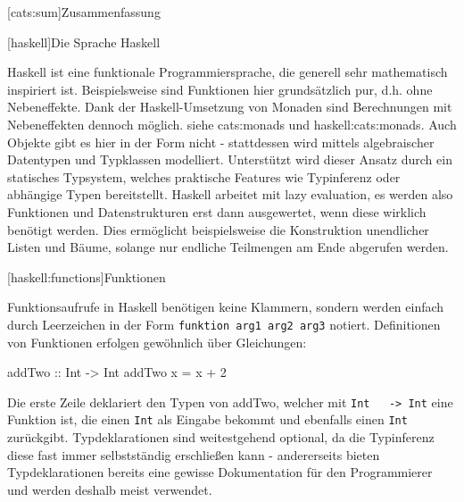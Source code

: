 \documentclass[11pt, a4paper, bibgerm]{scrbook}
\newcommand\icode[1]{\lstinline?#1?}
\newcommand\lchapter{}
\newcommand\lsection{}
\newcommand\sref{}
\begin{document}
\lsection[cats:sum]{Zusammenfassung}

\lchapter[haskell]{Die Sprache Haskell}

Haskell ist eine funktionale Programmiersprache, die generell sehr
mathematisch inspiriert ist. Beispielsweise sind Funktionen hier
grundsätzlich pur, d.h. ohne Nebeneffekte. Dank der Haskell-Umsetzung
von Monaden sind Berechnungen mit Nebeneffekten dennoch möglich. siehe
\sref{cats:monads} und \sref{haskell:cats:monads}. Auch Objekte gibt es
hier in der Form nicht - stattdessen wird mittels algebraischer
Datentypen und Typklassen modelliert. Unterstützt wird dieser Ansatz
durch ein statisches Typsystem, welches praktische Features wie
Typinferenz oder abhängige Typen bereitstellt. Haskell arbeitet mit lazy
evaluation, es werden also Funktionen und Datenstrukturen erst dann
ausgewertet, wenn diese wirklich benötigt werden. Dies ermöglicht
beispielsweise die Konstruktion unendlicher Listen und Bäume, solange
nur endliche Teilmengen am Ende abgerufen werden.

\lsection[haskell:functions]{Funktionen}

Funktionsaufrufe in Haskell benötigen keine Klammern, sondern werden
einfach durch Leerzeichen in der Form \icode{funktion arg1 arg2 arg3}
notiert. Definitionen von Funktionen erfolgen gewöhnlich über
Gleichungen:
\begin{code}
addTwo :: Int -> Int
addTwo x = x + 2  
\end{code}
Die erste Zeile deklariert den Typen von addTwo, welcher mit \icode{Int
  -> Int} eine Funktion ist, die einen \icode{Int} als Eingabe bekommt
und ebenfalls einen \icode{Int} zurückgibt. Typdeklarationen sind
weitestgehend optional, da die Typinferenz diese fast immer
selbstständig erschließen kann - andererseits bieten Typdeklarationen
bereits eine gewisse Dokumentation für den Programmierer und werden
deshalb meist verwendet.
\end{document}
